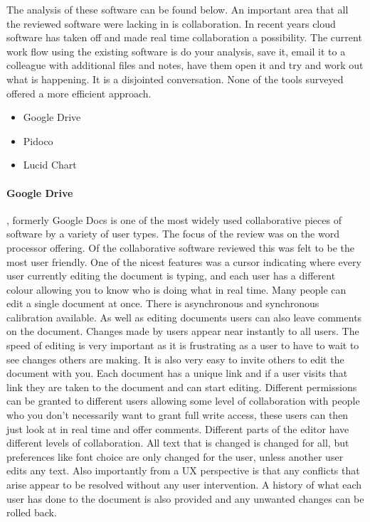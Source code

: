 The analysis of these software can be found below.  An important area that all the reviewed software were lacking in is collaboration.  In recent years cloud software has taken off and made real time collaboration a possibility.  The current work flow using the existing software is do your analysis, save it, email it to a colleague with additional files and notes, have them open it and try and work out what is happening.  It is a disjointed conversation.  None of the tools surveyed offered a more efficient approach.

\begin{itemize}
\item Google Drive
\item Pidoco
\item Lucid Chart
\end{itemize}

\paragraph{Google Drive}, formerly Google Docs is one of the most widely used collaborative pieces of software by a variety of user types.  The focus of the review was on the word processor offering.  Of the collaborative software reviewed this was felt to be the most user friendly.  One of the nicest features was a cursor indicating where every user currently editing the document is typing, and each user has a different colour allowing you to know who is doing what in real time.  Many people can edit a single document at once.  There is asynchronous and synchronous calibration available.  As well as editing documents users can also leave comments on the document.  Changes made by users appear near instantly to all users.  The speed of editing is very important as it is frustrating as a user to have to wait to see changes others are making.  It is also very easy to invite others to edit the document with you.  Each document has a unique link and if a user visits that link they are taken to the document and can start editing.  Different permissions can be granted to different users allowing some level of collaboration with people who you don't necessarily want to grant full write access, these users can then just look at in real time and offer comments.  Different parts of the editor have different levels of collaboration.  All text that is changed is changed for all, but preferences like font choice are only changed for the user, unless another user edits any text.  Also importantly from a UX perspective is that any conflicts that arise appear to be resolved without any user intervention.  A history of what each user has done to the document is also provided and any unwanted changes can be rolled back.

